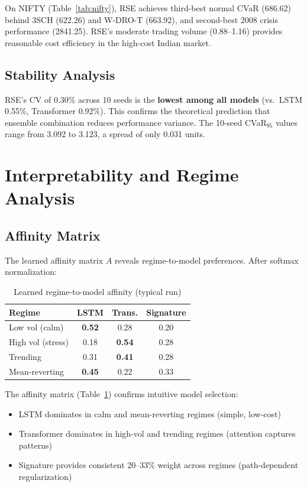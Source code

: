 \documentclass[11pt]{article}
\begin{document}
On NIFTY (Table~\ref{tab:nifty}), RSE achieves third-best normal CVaR (686.62) behind 3SCH (622.26) and W-DRO-T (663.92), and second-best 2008 crisis performance (2841.25). RSE's moderate trading volume (0.88--1.16) provides reasonable cost efficiency in the high-cost Indian market.

\subsection{Stability Analysis}

RSE's CV of 0.30\% across 10 seeds is the \textbf{lowest among all models} (vs.\ LSTM 0.55\%, Transformer 0.92\%). This confirms the theoretical prediction that ensemble combination reduces performance variance. The 10-seed CVaR$_{95}$ values range from 3.092 to 3.123, a spread of only 0.031 units.

\section{Interpretability and Regime Analysis}
\label{sec:interpretability}

\subsection{Affinity Matrix}

The learned affinity matrix $A$ reveals regime-to-model preferences. After softmax normalization:

\begin{table}[t]
\centering
\caption{Learned regime-to-model affinity (typical run)}
\label{tab:affinity}
\small
\begin{tabular}{lccc}
\toprule
\textbf{Regime} & \textbf{LSTM} & \textbf{Trans.} & \textbf{Signature} \\
\midrule
Low vol (calm) & \textbf{0.52} & 0.28 & 0.20 \\
High vol (stress) & 0.18 & \textbf{0.54} & 0.28 \\
Trending & 0.31 & \textbf{0.41} & 0.28 \\
Mean-reverting & \textbf{0.45} & 0.22 & 0.33 \\
\bottomrule
\end{tabular}
\end{table}

The affinity matrix (Table~\ref{tab:affinity}) confirms intuitive model selection:
\begin{itemize}[noitemsep]
    \item LSTM dominates in calm and mean-reverting regimes (simple, low-cost)
    \item Transformer dominates in high-vol and trending regimes (attention captures patterns)
    \item Signature provides consistent 20--33\% weight across regimes (path-dependent regularization)
\end{itemize}
\end{document}
